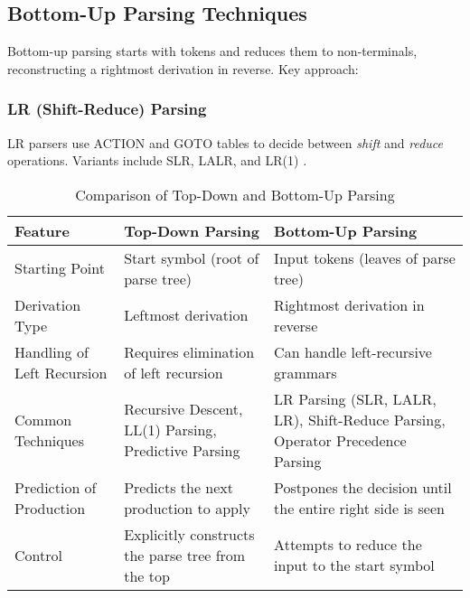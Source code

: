 \subsection{Bottom-Up Parsing Techniques}

Bottom-up parsing starts with tokens and reduces them to non-terminals, reconstructing a rightmost derivation in reverse. Key approach:

\subsubsection*{LR (Shift-Reduce) Parsing}
LR parsers use ACTION and GOTO tables to decide between \textit{shift} and \textit{reduce} operations. Variants include SLR, LALR, and LR(1) \cite{aho2007compilers}.


\begin{table}[h!]
    \centering
    \renewcommand{\arraystretch}{1.2} %
    \begin{tabularx}{\textwidth}{|
        >{\raggedright\arraybackslash}p{}|
        >{\raggedright\arraybackslash}X|
        >{\raggedright\arraybackslash}X|
      }
      \hline
      \textbf{Feature} & \textbf{Top-Down Parsing} & \textbf{Bottom-Up Parsing} \\
      \hline
      Starting Point
        & Start symbol (root of parse tree)
        & Input tokens (leaves of parse tree) \\
      \hline
      Derivation Type
        & Leftmost derivation
        & Rightmost derivation in reverse \\
      \hline
      Handling of Left Recursion
        & Requires elimination of left recursion
        & Can handle left-recursive grammars \\
      \hline
      Common Techniques
        & Recursive Descent, LL(1) Parsing, Predictive Parsing
        & LR Parsing (SLR, LALR, LR), Shift-Reduce Parsing, Operator Precedence Parsing \\
      \hline
      Prediction of Production
        & Predicts the next production to apply
        & Postpones the decision until the entire right side is seen \\
      \hline
      Control
        & Explicitly constructs the parse tree from the top
        & Attempts to reduce the input to the start symbol \\
      \hline
    \end{tabularx}
    \caption{Comparison of Top-Down and Bottom-Up Parsing}
    \label{tab:td-vs-bu}
  \end{table}


\pagebreak
